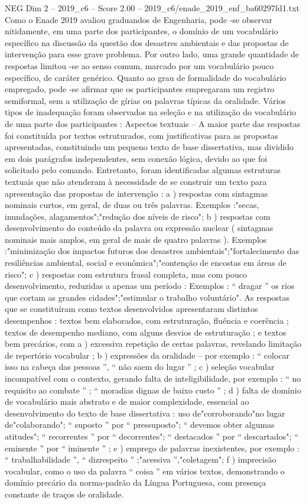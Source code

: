 \begin{textsample}{NEG Dim 2 – 2019\_c6 – Score 2.00 – 2019\_c6/enade\_2019\_enf\_ba60297fd1.txt}
Como o Enade 2019 avaliou graduandos de Engenharia, pode -se observar nitidamente, em uma parte dos participantes, o domínio de um vocabulário específico na discussão da questão dos desastres ambientais e das propostas de intervenção para esse grave problema.
Por outro lado, uma grande quantidade de respostas limitou -se ao senso comum, marcado por um vocabulário pouco específico, de caráter genérico.
Quanto ao grau de formalidade do vocabulário empregado, pode -se afirmar que os participantes empregaram um registro semiformal, sem a utilização de gírias ou palavras típicas da oralidade.
Vários tipos de inadequação foram observados na seleção e na utilização do vocabulário de uma parte dos participantes : Aspectos textuais – A maior parte das respostas foi constituída por textos estruturados, com justificativas para as propostas apresentadas, constituindo um pequeno texto de base dissertativa, mas dividido em dois parágrafos independentes, sem conexão lógica, devido ao que foi solicitado pelo comando.
Entretanto, foram identificadas algumas estruturas textuais que não atenderam à necessidade de se construir um texto para apresentação das propostas de intervenção : a ) respostas com sintagmas nominais curtos, em geral, de duas ou três palavras.
Exemplos :"secas, inundações, alagamentos";"redução dos níveis de risco"; b ) respostas com desenvolvimento do conteúdo da palavra ou expressão nuclear ( sintagmas nominais mais amplos, em geral de mais de quatro palavras ).
Exemplos :"minimização dos impactos futuros dos desastres ambientais";"fortalecimento das resiliências ambiental, social e econômica";"contenção de encostas em áreas de risco"; c ) respostas com estrutura frasal completa, mas com pouco desenvolvimento, reduzidas a apenas um período : Exemplos : “ dragar ” os rios que cortam as grandes cidades";"estimular o trabalho voluntário".
As respostas que se constituíram como textos desenvolvidos apresentaram distintos desempenhos : textos bem elaborados, com estruturação, fluência e coerência ; textos de desempenho mediano, com alguns desvios de estruturação ; e textos bem precários, com a ) excessiva repetição de certas palavras, revelando limitação de repertório vocabular ; b ) expressões da oralidade – por exemplo : “ colocar isso na cabeça das pessoas ”, “ não saem do lugar ” ; c ) seleção vocabular incompatível com o contexto, gerando falta de inteligibilidade, por exemplo : “ no requisito ao combate ” ; “ moradias dignas de baixo custo ” ; d ) falta de domínio de vocabulário mais abstrato e de maior complexidade, essencial ao desenvolvimento do texto de base dissertativa : uso de"corroborando"no lugar de"colaborando"; “ suposto ” por “ pressuposto"; “ devemos obter algumas atitudes"; “ recorrentes ” por “ decorrentes"; “ destacados ” por “ descartados"; “ eminente ” por “ iminente ” ; e ) emprego de palavras inexistentes, por exemplo : “ trabalhabilidade ”, “ dizrespeito ” ;"acessiva ”,"coletagem"; f ) imprecisão vocabular, como o uso da palavra “ coisa ” em vários textos, demonstrando o domínio precário da norma-padrão da Língua Portuguesa, com presença constante de traços de oralidade.

\end{textsample}
